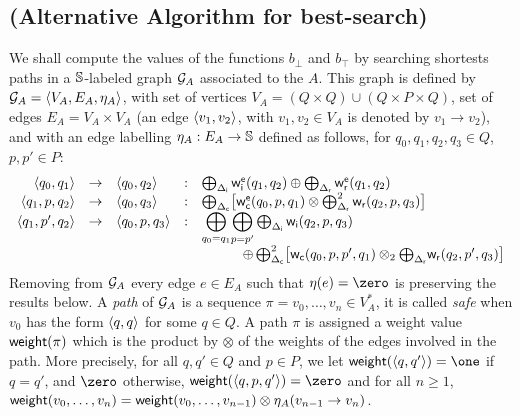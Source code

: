 %

\subsection*{(Alternative Algorithm for best-search)}
We shall compute the values of the functions $b_\bot$ and $b_\top$
by searching shortests paths in a $\mathbb{S}$-labeled graph $\mathcal{G}_A$
associated to the \SWVPA $A$. 
This graph is defined by $\G_A = \< V_A, E_A, \eta_A >$, 
with set of vertices $V_A = (Q \times Q) \cup (Q \times P \times Q)$,
set of edges $E_A = V_A \times V_A$
(an edge $\< v_1, v_2>$, with $v_1, v_2 \in V_A$ is denoted by $v_1 \to v_2$),
and with an edge labelling  
$\eta_A : E_A \to \mathbb{S}$ defined as follows,
for $q_0, q_1, q_2, q_3 \in Q$, $p, p' \in P$:
%
\[
\begin{array}{rclcl}
%
\< q_0, q_1> & \to & \< q_0, q_2> & : &
\bigoplus_{\Deltai} \weiei(q_1, q_2) \oplus \bigoplus_{\Deltar} \weier(q_1, q_2)\\
%
\< q_1, p, q_2> & \to & \<q_0, q_3> & : &
\bigoplus_{\Deltac} \bigl[ \weiec(q_0, p, q_1) \otimes \bigoplus^2_{\Deltar} \weir(q_2, p, q_3)\bigr]\\ 
%
%
\< q_1, p', q_2> & \to & \< q_0, p, q_3> & : &
{\displaystyle\bigoplus_{q_0=q_1}}
{\displaystyle\bigoplus_{p=p'}}
 \bigoplus_{\Deltai} \weii(q_2, p, q_3)\\
 & & & & 
\qquad\quad 
\oplus \bigoplus^2_{\Deltac} \bigl[ \weic(q_0, p, p', q_1) \otimes_2 {\bigoplus_{\Deltar}} \weir(q_2, p', q_3) \bigr]\\
%
\end{array}
\]
Removing from $\mathcal{G}_A$ every edge $e \in E_A$ such that $\eta(e) = \zero$ 
is preserving the results below.
%
A \emph{path} of $\mathcal{G}_A$ is a sequence $\pi = v_0,\ldots, v_n \in V^*_A$,
it is called \emph{safe} when $v_0$ has the form $\< q, q>$ for some $q \in Q$.
A path $\pi$ is assigned a weight value $\mathsf{weight}(\pi)$ which is the product by $\otimes$ 
of the weights of the edges involved in the path.
More precisely, for all $q, q' \in Q$ and $p \in P$, we let 
$\weight(\< q, q' > ) = \one$ if $q = q'$, and $\zero$ otherwise, 
$\weight(\< q, p, q' > ) = \zero$ and 
for all $n \geq 1$, 
$\mathsf{weight}(v_0,\ldots, v_n) = \mathsf{weight}(v_0,\ldots, v_{n-1}) \otimes \eta_A(v_{n-1} \to v_{n})$.

